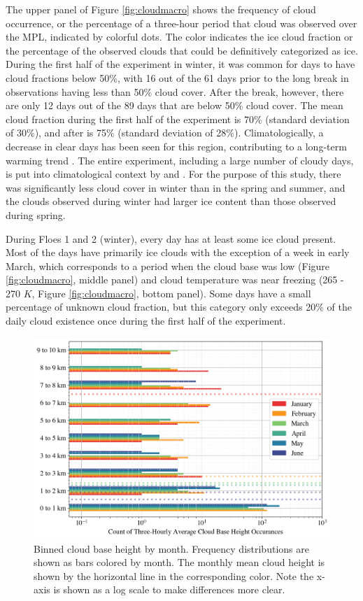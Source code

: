 The upper panel of Figure \ref{fig:cloudmacro} shows the frequency of cloud occurrence, or the percentage of a three-hour period that cloud was observed over the MPL, indicated by colorful dots. The color indicates the ice cloud fraction or the percentage of the observed clouds that could be definitively categorized as ice. During the first half of the experiment in winter, it was common for days to have cloud fractions below 50$\%$, with 16 out of the 61 days prior to the long break in observations having less than 50$\%$ cloud cover. After the break, however, there are only 12 days out of the 89 days that are below 50$\%$ cloud cover. The mean cloud fraction during the first half of the experiment is 70$\%$ (standard deviation of 30$\%$), and after is 75$\%$ (standard deviation of 28$\%$). Climatologically, a decrease in clear days has been seen for this region, contributing to a long-term warming trend \citep{kayser:2017}. The entire experiment, including a large number of cloudy days, is put into climatological context by \citet{graham:2017:events} and \citet{kayser:2017}. For the purpose of this study, there was significantly less cloud cover in winter than in the spring and summer, and the clouds observed during winter had larger ice content than those observed during spring.

During Floes 1 and 2 (winter), every day has at least some ice cloud present. Most of the days have primarily ice clouds with the exception of a week in early March, which corresponds to a period when the cloud base was low (Figure \ref{fig:cloudmacro}, middle panel) and cloud temperature was near freezing (265 - 270 $K$, Figure \ref{fig:cloudmacro}, bottom panel). Some days have a small percentage of unknown cloud fraction, but this category only exceeds 20$\%$ of the daily cloud existence once during the first half of the experiment. 

\begin{figure}[b!]
    \centering
    \includegraphics[width=1\linewidth]{figures/chapter4/CloudHeights.png}
    \caption[Cloud base height by month histogram.]{Binned cloud base height by month. Frequency distributions are shown as bars colored by month. The monthly mean cloud height is shown by the horizontal line in the corresponding color. Note the x-axis is shown as a log scale to make differences more clear.}
    \label{fig:cloudbase}
\end{figure}

